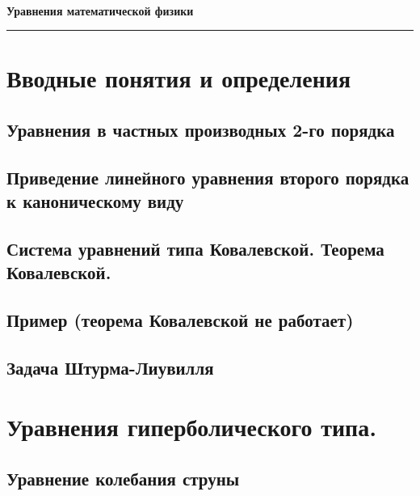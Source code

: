 \documentclass[12pt, a4paper]{article}
\date{}
\author{}
\begin{document}
\thispagestyle{empty}
~
\\[5cm]
\pagecolor[rgb]{0.9,0.9,0.9}
\begin{minipage}{12cm}
\textcolor[rgb]{0,0,0}{\Huge
\textbf{Уравнения математической физики}\\}
{\color[rgb]{0,0,0}\hrule height 1.5pt}
\end{minipage}
\hfill
\vfill
\newpage
\pagecolor{white}

\tableofcontents

\parindent=0pt
\section{Вводные понятия и определения}
	\subsection{Уравнения в частных производных 2-го порядка}\label{que:3}\label{que:6}
		 \newpage 

	\subsection{Приведение линейного уравнения второго порядка к каноническому виду}\label{que:7}	
		 \newpage 	

	\subsection{Система уравнений типа Ковалевской. Теорема Ковалевской.}
		 \newpage 

	\subsection{Пример (теорема Ковалевской не работает)}
		 \newpage 

	\subsection{Задача Штурма-Лиувилля}\label{que:15}	
		
	

\section{Уравнения гиперболического типа.}
	\subsection{Уравнение колебания струны}\label{que:1}
		 \newpage
\end{document}
